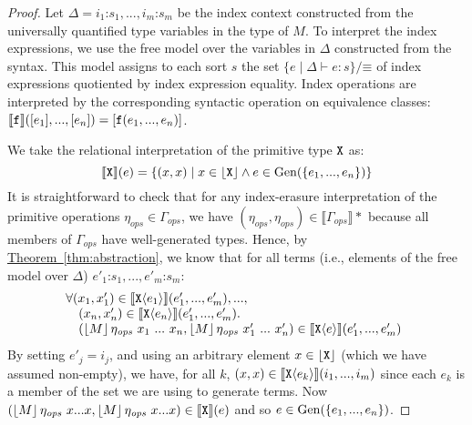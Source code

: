 \documentclass{sigplanconf}
\newcommand{\sepbar}{\mathrel|}
\newcommand{\tyPrim}[2]{\textup{\texttt{#1}}\langle #2 \rangle}
\newcommand{\tyPrimNm}[1]{\textup{\texttt{#1}}}
\newcommand{\tySem}[1]{\left\lfloor #1 \right\rfloor}
\newcommand{\tmSem}[1]{\left\lfloor{#1}\right\rfloor}
\newcommand{\rsem}[1]{\llbracket #1 \rrbracket}
\newcommand{\thmref}[1]{\hyperref[#1]{Theorem~\ref*{#1}}}
\theoremstyle{examplestyle}
\theoremstyle{restatementstyle}
\begin{document}
\begin{proof}
  Let $\Delta = i_1\mathord:s_1,...,i_m\mathord:s_m$ be the index
  context constructed from the universally quantified type variables
  in the type of $M$.  To interpret the index expressions, we use the
  free model over the variables in $\Delta$ constructed from the
  syntax. This model assigns to each sort $s$ the set $\{ e \sepbar
  \Delta \vdash e : s \}/\mathord\equiv$ of index expressions
  quotiented by index expression equality. Index operations are
  interpreted by the corresponding syntactic operation on equivalence
  classes: $\llbracket \texttt{\textup{f}} \rrbracket([e_1],...,[e_n]) =
  [\texttt{\textup{f}}(e_1,...,e_n)]$.

  We take the relational interpretation of the primitive type
  $\tyPrimNm{X}$ as:
  \begin{displaymath}
    \semPrimType{\tyPrimNm{X}}(e) = \{ (x,x) \sepbar x \in \tySem{\tyPrimNm{X}} \land e \in \mathrm{Gen}(\{e_1,...,e_n\}) \}
  \end{displaymath}
  It is straightforward to check that for any index-erasure
  interpretation of the primitive operations $\eta_{\mathit{ops}} \in
  \Gamma_{\mathit{ops}}$, we have $(\eta_{\mathit{ops}},
  \eta_{\mathit{ops}}) \in \rsem{\Gamma_{\mathit{ops}}}*$ because 
  all members of $\Gamma_{\mathit{ops}}$ have well-generated
  types. Hence, by \thmref{thm:abstraction}, we know that for all
  terms (i.e., elements of the free model over $\Delta$)
  $e'_1\mathord:s_1,...,e'_m\mathord:s_m$:
  \begin{displaymath}%
    \begin{array}{@{}l}
      \forall (x_1,x_1') \in \rsem{\tyPrim{X}{e_1}}(e'_1,...,e'_m), ..., \\
      \quad(x_n, x'_n) \in \rsem{\tyPrim{X}{e_n}}(e'_1,...,e'_m). \\
      \quad (\tmSem{M} \eta_{\mathit{ops}}~x_1 ~...~x_n, \tmSem{M}\eta_{\mathit{ops}}~x'_1~...~x'_n) \in \rsem{\tyPrim{X}{e}}(e'_1,...,e'_m)
    \end{array}
  \end{displaymath}
  By setting $e'_j = i_j$, and using an arbitrary element $x \in
  \tySem{\tyPrimNm{X}}$ (which we have assumed non-empty), we have,
  for all $k$, $(x,x) \in \rsem{\tyPrim{X}{e_k}}(i_1,...,i_m)$ since
  each $e_k$ is a member of the set we are using to generate
  terms. Now $(\tmSem{M} \eta_{\mathit{ops}}~x...x,
  \tmSem{M}\eta_{\mathit{ops}}~x...x) \in \rsem{\tyPrimNm{X}}(e)$ and
  so $e \in \mathrm{Gen}(\{e_1,...,e_n\})$.
\end{proof}
\end{document}
